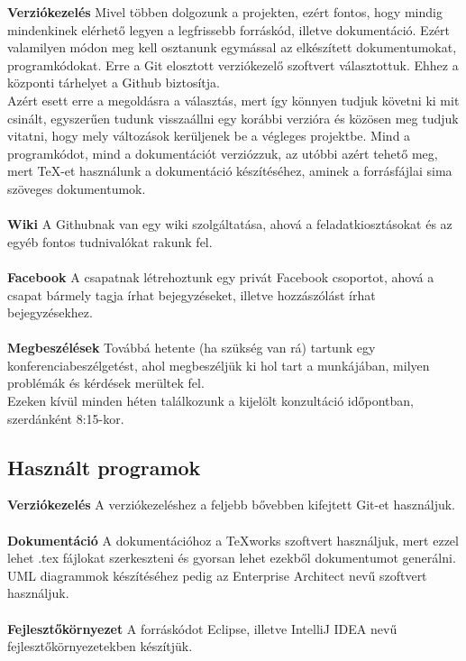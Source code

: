 \textbf{Verziókezelés} Mivel többen dolgozunk a projekten, ezért fontos, hogy mindig mindenkinek elérhető legyen a legfrissebb forráskód, illetve dokumentáció. Ezért valamilyen módon meg kell osztanunk egymással az elkészített dokumentumokat, programkódokat. Erre a Git elosztott verziókezelő szoftvert választottuk. Ehhez a központi tárhelyet a Github biztosítja. \\ 
Azért esett erre a megoldásra a választás, mert így könnyen tudjuk követni ki mit csinált, egyszerűen tudunk visszaállni egy korábbi verzióra és közösen meg tudjuk vitatni, hogy mely változások kerüljenek be a végleges projektbe. 
Mind a programkódot, mind a dokumentációt verziózzuk, az utóbbi azért tehető meg, mert TeX-et használunk a dokumentáció készítéséhez, aminek a forrásfájlai sima szöveges dokumentumok.
\\ \\
\textbf{Wiki}
A Githubnak van egy wiki szolgáltatása, ahová a feladatkiosztásokat és az egyéb fontos tudnivalókat rakunk fel. \\ \\
\textbf{Facebook}
A csapatnak létrehoztunk egy privát Facebook csoportot, ahová a csapat bármely tagja írhat bejegyzéseket, illetve hozzászólást írhat bejegyzésekhez. \\ \\
\textbf{Megbeszélések}
Továbbá hetente (ha szükség van rá) tartunk egy konferenciabeszélgetést, ahol megbeszéljük ki hol tart a munkájában, milyen problémák és kérdések merültek fel. \\
Ezeken kívül minden héten találkozunk a kijelölt konzultáció időpontban, szerdánként 8:15-kor.

\subsection{Használt programok}
\textbf{Verziókezelés} 
A verziókezeléshez a feljebb bővebben kifejtett Git-et használjuk. \\ \\ 
\textbf{Dokumentáció}
A dokumentációhoz a TeXworks szoftvert használjuk, mert ezzel lehet .tex fájlokat szerkeszteni és gyorsan lehet ezekből dokumentumot generálni. \\
UML diagrammok készítéséhez pedig az Enterprise Architect nevű szoftvert használjuk. \\ \\
\textbf{Fejlesztőkörnyezet}
A forráskódot Eclipse, illetve IntelliJ IDEA nevű fejlesztőkörnyezetekben készítjük.

